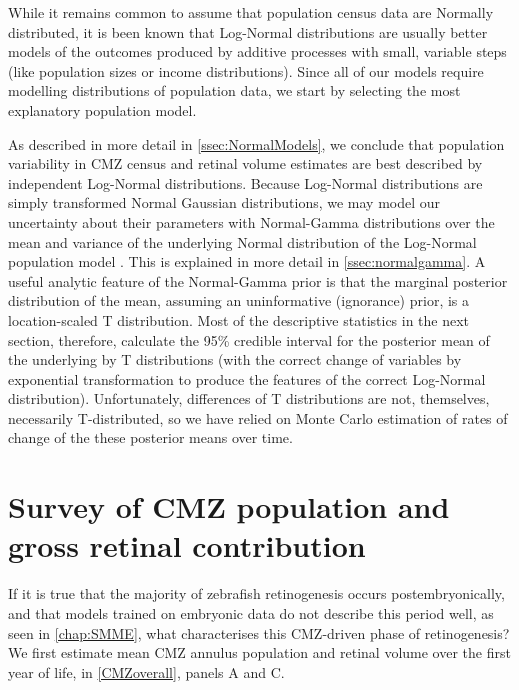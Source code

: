 While it remains common to assume that population census data are Normally distributed, it is been known \cite{Heath1967} that Log-Normal distributions are usually better models of the outcomes produced by additive processes with small, variable steps (like population sizes or income distributions). Since all of our models require modelling distributions of population data, we start by selecting the most explanatory population model.

As described in more detail in \autoref{ssec:NormalModels}, we conclude that population variability in CMZ census and retinal volume estimates are best described by independent Log-Normal distributions. Because Log-Normal distributions are simply transformed Normal Gaussian distributions, we may model our uncertainty about their parameters with Normal-Gamma distributions over the mean and variance of the underlying Normal distribution of the Log-Normal population model \cite{Murphy2007}. This is explained in more detail in \autoref{ssec:normalgamma}. A useful analytic feature of the Normal-Gamma prior is that the marginal posterior distribution of the mean, assuming an uninformative (ignorance) prior, is a location-scaled T distribution. Most of the descriptive statistics in the next section, therefore, calculate the 95\% credible interval for the posterior mean of the underlying by T distributions (with the correct change of variables by exponential transformation to produce the features of the correct Log-Normal distribution). Unfortunately, differences of T distributions are not, themselves, necessarily T-distributed, so we have relied on Monte Carlo estimation of rates of change of the these posterior means over time. 

\section{Survey of CMZ population and gross retinal contribution}

If it is true that the majority of zebrafish retinogenesis occurs postembryonically, and that models trained on embryonic data do not describe this period well, as seen in \autoref{chap:SMME}, what characterises this CMZ-driven phase of retinogenesis? We first estimate mean CMZ annulus population and retinal volume over the first year of life, in \autoref{CMZoverall}, panels A and C.


